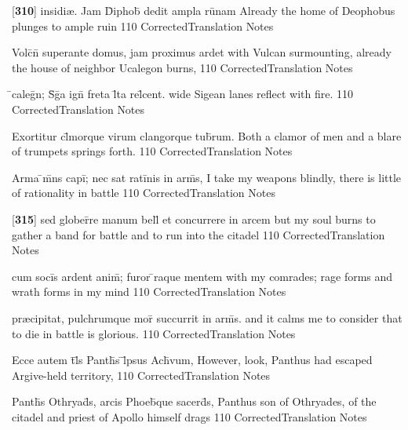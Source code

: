 \latline
  {[\textbf{310}] insidi{\ae}.  Jam D\={}iphob\={\macron {\i}} dedit ampla ru\={\macron {\i}}nam}
  { Already the home of Deophobus plunges to ample ruin  }
  {110}
  { CorrectedTranslation }
  { Notes }


\latline
  {Volc\={}n\={} superante domus, jam proximus ardet}
  { with Vulcan surmounting, already the house of neighbor Ucalegon burns, }
  {110}
  { CorrectedTranslation }
  { Notes }


\latline
  {\={}caleg\={}n; S\={\macron {\i}}g\={}a ign\={\macron {\i}} freta l\={}ta rel\={}cent.}
  { wide Sigean lanes reflect with fire. }
  {110}
  { CorrectedTranslation }
  { Notes }


\latline
  {Exortitur cl\={}morque virum clangorque tub\={}rum.}
  { Both a clamor of men and a blare of trumpets springs forth. }
  {110}
  { CorrectedTranslation }
  { Notes }


\latline
  {Arma \={}m\={}ns capi\={}; nec sat rati\={}nis in arm\={\macron {\i}}s,}
  { I take my weapons blindly, there is little of rationality in battle }
  {110}
  { CorrectedTranslation }
  { Notes }


\latline
  {[\textbf{315}] sed glober\={}re manum bell\={} et concurrere in arcem }
  { but my soul burns to gather a band for battle and to run into the citadel }
  {110}
  { CorrectedTranslation }
  { Notes }


\latline
  {cum soci\={\macron {\i}}s ardent anim\={\macron {\i}}; furor \={\macron {\i}}raque mentem}
  { with my comrades; rage forms and wrath forms in my mind }
  {110}
  { CorrectedTranslation }
  { Notes }


\latline
  {pr{\ae}cipitat, pulchrumque mor\={\macron {\i}} succurrit in arm\={\macron {\i}}s.}
  { and it calms me to consider that to die in battle is glorious. }
  {110}
  { CorrectedTranslation }
  { Notes }


\latline
  {Ecce autem t\={}l\={\macron {\i}}s Panth\={}s \={}l\={}psus Ach\={\macron {\i}}vum,}
  { However, look, Panthus had escaped Argive-held territory, }
  {110}
  { CorrectedTranslation }
  { Notes }


\latline
  {Panth\={}s Othryad\={}s, arcis Phoeb\={\macron {\i}}que sacerd\={}s,}
  { Panthus son of Othryades, of the citadel and priest of Apollo himself drags }
  {110}
  { CorrectedTranslation }
  { Notes }


